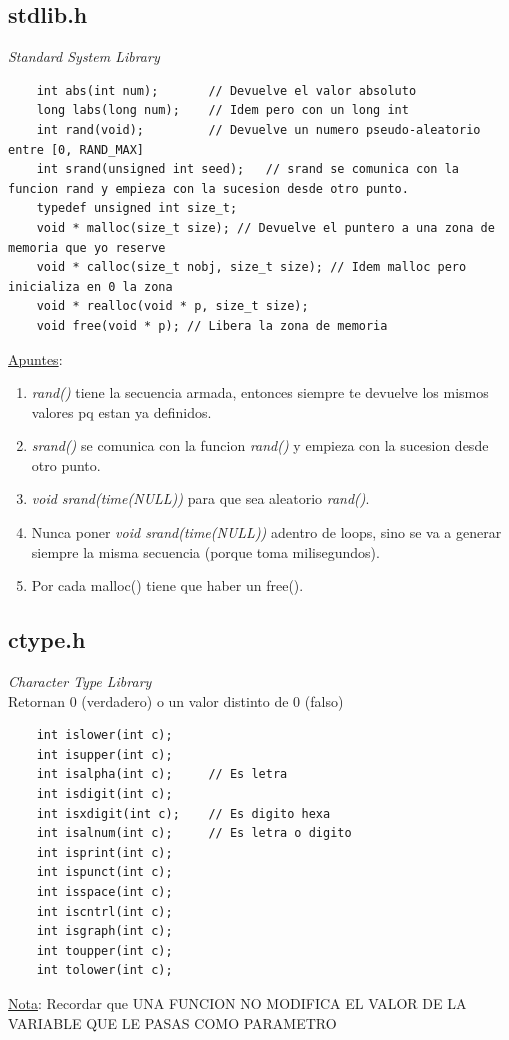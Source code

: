 \documentclass{article}
\begin{document}
\subsection{stdlib.h}
\emph{Standard System Library}
\begin{lstlisting}
    int abs(int num);       // Devuelve el valor absoluto
    long labs(long num);    // Idem pero con un long int
    int rand(void);         // Devuelve un numero pseudo-aleatorio entre [0, RAND_MAX]
    int srand(unsigned int seed);   // srand se comunica con la funcion rand y empieza con la sucesion desde otro punto. 
    typedef unsigned int size_t;
    void * malloc(size_t size); // Devuelve el puntero a una zona de memoria que yo reserve
    void * calloc(size_t nobj, size_t size); // Idem malloc pero inicializa en 0 la zona
    void * realloc(void * p, size_t size);
    void free(void * p); // Libera la zona de memoria
\end{lstlisting}
\underline{Apuntes}: 
\begin{enumerate}
    \item \emph{rand()} tiene la secuencia armada, entonces siempre te devuelve los mismos valores pq estan ya definidos.
    \item \emph{srand()} se comunica con la funcion \emph{rand()} y empieza con la sucesion desde otro punto. 
    \item \emph{void srand(time(NULL))} para que sea aleatorio \emph{rand()}. 
    \item Nunca poner \emph{void srand(time(NULL))} adentro de loops, sino se va a generar siempre la misma secuencia (porque toma milisegundos).
    \item Por cada malloc() tiene que haber un free().
\end{enumerate}

\subsection{ctype.h}
\emph{Character Type Library}
\\Retornan 0 (verdadero) o un valor distinto de 0 (falso)
\begin{lstlisting}
    int islower(int c);
    int isupper(int c);
    int isalpha(int c);     // Es letra
    int isdigit(int c);
    int isxdigit(int c);    // Es digito hexa
    int isalnum(int c);     // Es letra o digito
    int isprint(int c);
    int ispunct(int c);
    int isspace(int c);
    int iscntrl(int c);
    int isgraph(int c);
    int toupper(int c);
    int tolower(int c);
\end{lstlisting}
\underline{Nota}: Recordar que UNA FUNCION NO MODIFICA EL VALOR DE LA VARIABLE QUE LE PASAS COMO PARAMETRO
\end{document}
